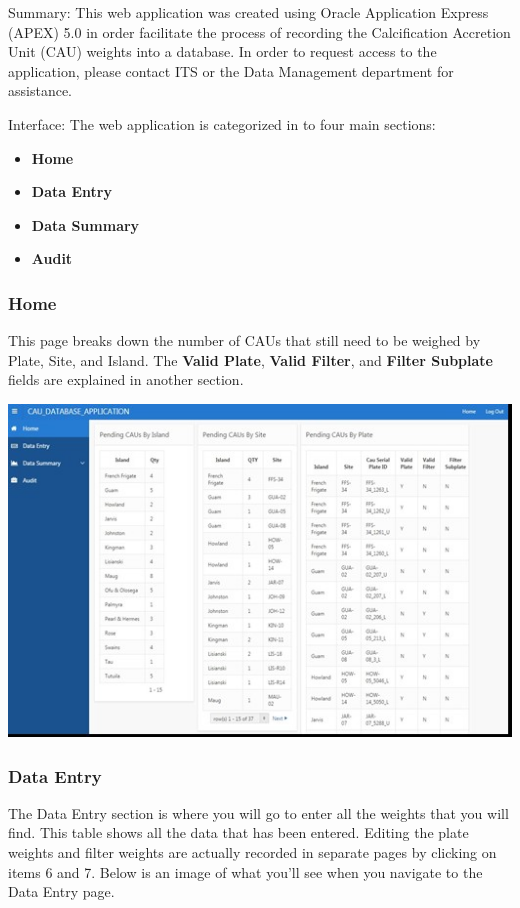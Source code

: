 \documentclass[]{book}
\providecommand{\tightlist}{%
  \setlength{\itemsep}{0pt}\setlength{\parskip}{0pt}}
\begin{document}
Summary: This web application was created using Oracle Application Express (APEX) 5.0 in order facilitate the process of recording the Calcification Accretion Unit (CAU) weights into a database. In order to request access to the application, please contact ITS or the Data Management department for assistance.

Interface: The web application is categorized in to four main sections:

\begin{itemize}
\tightlist
\item
  \textbf{Home}
\item
  \textbf{Data Entry}
\item
  \textbf{Data Summary}
\item
  \textbf{Audit}
\end{itemize}

\hypertarget{home}{%
\subsubsection{Home}\label{home}}

This page breaks down the number of CAUs that still need to be weighed by Plate, Site, and Island. The
\textbf{Valid Plate}, \textbf{Valid Filter}, and \textbf{Filter Subplate} fields are explained in another section.

\includegraphics{images/Data1.jpg}

\hypertarget{data-entry}{%
\subsubsection{Data Entry}\label{data-entry}}

The Data Entry section is where you will go to enter all the weights that you will find. This table shows all the data that has been entered. Editing the plate weights and filter weights are actually recorded in separate pages by clicking on items 6 and 7. Below is an image of what you'll see when you navigate to the Data Entry page.
\end{document}
